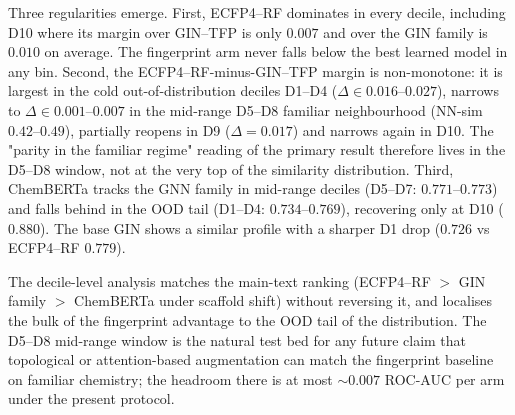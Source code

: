 \documentclass[11pt,a4paper]{article}
\begin{document}
Three regularities emerge. First, ECFP4--RF dominates in every decile, including D\num{10} where its margin over GIN--TFP is only $\num{+0.007}$ and over the GIN family is $\num{+0.010}$ on average. The fingerprint arm never falls below the best learned model in any bin. Second, the ECFP4--RF-minus-GIN--TFP margin is non-monotone: it is largest in the cold out-of-distribution deciles D\num{1}--D\num{4} ($\Delta \in \numrange{0.016}{0.027}$), narrows to $\Delta \in \numrange{0.001}{0.007}$ in the mid-range D\num{5}--D\num{8} familiar neighbourhood (NN-sim $\num{0.42}$--$\num{0.49}$), partially reopens in D\num{9} ($\Delta = \num{+0.017}$) and narrows again in D\num{10}. The "parity in the familiar regime" reading of the primary result therefore lives in the D\num{5}--D\num{8} window, not at the very top of the similarity distribution. Third, ChemBERTa tracks the GNN family in mid-range deciles (D\num{5}--D\num{7}: $\num{0.771}$--$\num{0.773}$) and falls behind in the OOD tail (D\num{1}--D\num{4}: $\num{0.734}$--$\num{0.769}$), recovering only at D\num{10} ($\num{0.880}$). The base GIN shows a similar profile with a sharper D\num{1} drop ($\num{0.726}$ vs ECFP4--RF $\num{0.779}$).

The decile-level analysis matches the main-text ranking (ECFP4--RF $>$ GIN family $>$ ChemBERTa under scaffold shift) without reversing it, and localises the bulk of the fingerprint advantage to the OOD tail of the distribution. The D\num{5}--D\num{8} mid-range window is the natural test bed for any future claim that topological or attention-based augmentation can match the fingerprint baseline on familiar chemistry; the headroom there is at most $\sim\num{0.007}$ ROC-AUC per arm under the present protocol.



\end{document}
